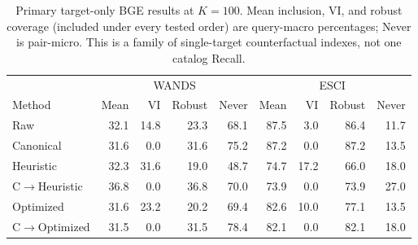\begin{table}[t]
\caption{Primary target-only BGE results at $K=100$. Mean inclusion, VI, and robust coverage (included under every tested order) are query-macro percentages; Never is pair-micro. This is a family of single-target counterfactual indexes, not one catalog Recall.}
\label{tab:optimization}\centering\small
\begin{tabular}{lrrrrrrrr}\toprule
&\multicolumn{4}{c}{WANDS}&\multicolumn{4}{c}{ESCI}\\
Method&Mean&VI&Robust&Never&Mean&VI&Robust&Never\\\midrule
Raw & 32.1 & 14.8 & 23.3 & 68.1 & 87.5 & 3.0 & 86.4 & 11.7\\
Canonical & 31.6 & 0.0 & 31.6 & 75.2 & 87.2 & 0.0 & 87.2 & 13.5\\
Heuristic & 32.3 & 31.6 & 19.0 & 48.7 & 74.7 & 17.2 & 66.0 & 18.0\\
C$\to$Heuristic & 36.8 & 0.0 & 36.8 & 70.0 & 73.9 & 0.0 & 73.9 & 27.0\\
Optimized & 31.6 & 23.2 & 20.2 & 69.4 & 82.6 & 10.0 & 77.1 & 13.5\\
C$\to$Optimized & 31.5 & 0.0 & 31.5 & 78.4 & 82.1 & 0.0 & 82.1 & 18.0\\
\bottomrule\end{tabular}
\end{table}
